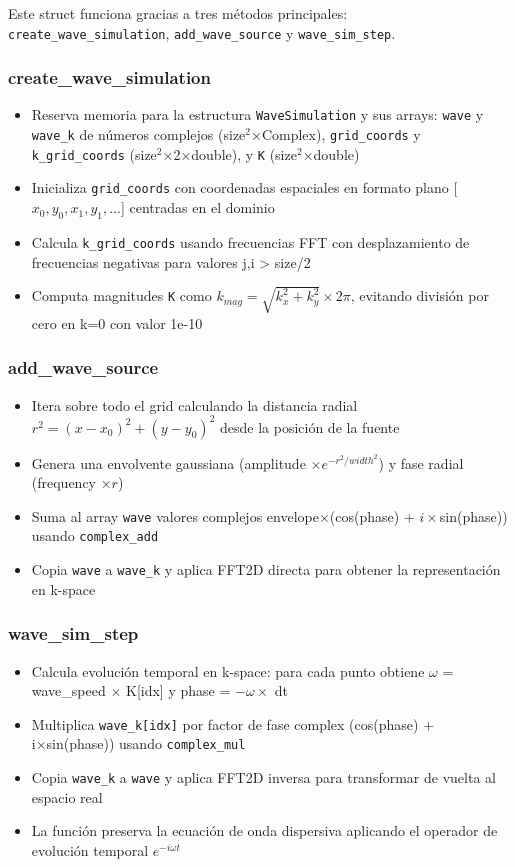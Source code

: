 \documentclass[a4paper]{article}
\begin{document}
Este struct funciona gracias a tres métodos principales: \texttt{create\_wave\_simulation}, \texttt{add\_wave\_source} y \texttt{wave\_sim\_step}.

\subsubsection{create\_wave\_simulation}
\begin{itemize}
    \item Reserva memoria para la estructura \texttt{WaveSimulation} y sus arrays: \texttt{wave} y \texttt{wave\_k} de números complejos (size$^2$×Complex), \texttt{grid\_coords} y \texttt{k\_grid\_coords} (size$^2$×2×double), y \texttt{K} (size$^2$×double)
    \item Inicializa \texttt{grid\_coords} con coordenadas espaciales en formato plano [$x_0,y_0,x_1,y_1,...$] centradas en el dominio
    \item Calcula \texttt{k\_grid\_coords} usando frecuencias FFT con desplazamiento de frecuencias negativas para valores j,i > size/2
    \item Computa magnitudes \texttt{K} como $k_{mag} = \sqrt{k_x^2 + k_y^2} \times 2\pi$, evitando división por cero en k=0 con valor 1e-10
\end{itemize}

\subsubsection{add\_wave\_source}
\begin{itemize}
    \item Itera sobre todo el grid calculando la distancia radial $r^2 = (x-x_0)^2 + (y-y_0)^2$ desde la posición de la fuente
    \item Genera una envolvente gaussiana (amplitude $\times e^{-r^2/width^2}$) y fase radial (frequency $\times r$)
    \item Suma al array \texttt{wave} valores complejos envelope$\times$(cos(phase) + $i\times$sin(phase)) usando \texttt{complex\_add}
    \item Copia \texttt{wave} a \texttt{wave\_k} y aplica FFT2D directa para obtener la representación en k-space
\end{itemize}

\subsubsection{wave\_sim\_step}
\begin{itemize}
    \item Calcula evolución temporal en k-space: para cada punto obtiene $\omega$ = wave\_speed $\times$ K[idx] y phase = $-\omega \times$ dt
    \item Multiplica \texttt{wave\_k[idx]} por factor de fase complex (cos(phase) + i×sin(phase)) usando \texttt{complex\_mul}
    \item Copia \texttt{wave\_k} a \texttt{wave} y aplica FFT2D inversa para transformar de vuelta al espacio real
    \item La función preserva la ecuación de onda dispersiva aplicando el operador de evolución temporal $e^{-i\omega t}$
\end{itemize}
\end{document}
